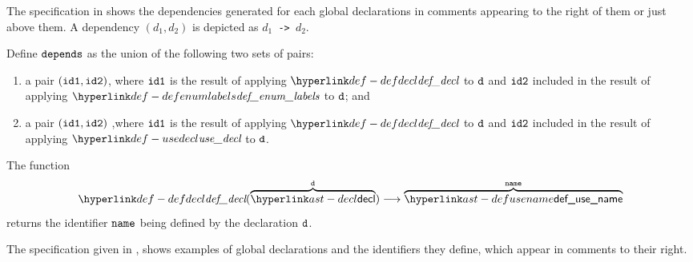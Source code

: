 The specification in 
shows the dependencies generated for each global declarations
in comments appearing to the right of them or just above them.
A dependency $(d_1,d_2)$ is depicted as \texttt{$d_1$ -> $d_2$}.

\ProseParagraph
Define $\dependencies$ as the union of the following two sets of pairs:
\begin{enumerate}
  \item a pair $(\idone, \idtwo)$, where $\idone$ is the result of applying $\defdecl$ to $\vd$
        and $\idtwo$ included in the result of applying $\defenumlabels$ to $\vd$; and
  \item a pair $(\idone, \idtwo)$ ,where $\idone$ is the result of applying $\defdecl$ to $\vd$
        and $\idtwo$ included in the result of applying $\usedecl$ to $\vd$.
\end{enumerate}

\FormallyParagraph
\begin{mathpar}
\end{mathpar}

\hypertarget{def-defdecl}{}
The function
\[
\defdecl(\overname{\decl}{\vd}) \aslto \overname{\defusename}{\name}
\]
returns the identifier $\name$ being defined by the declaration $\vd$.

The specification given in ,
shows examples of global declarations and the identifiers they define,
which appear in comments to their right.

